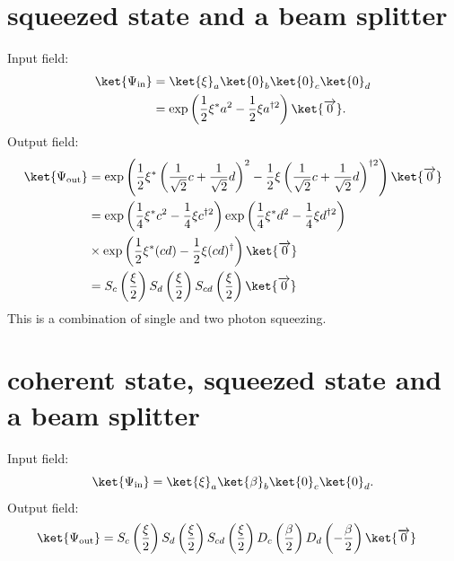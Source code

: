 \section{squeezed state and a beam splitter}
Input field:
\begin{align}
\ket{\Psi_{\rm{in}}} &= \ket{\xi}_a\ket{0}_b\ket{0}_c\ket{0}_d \\
&= \exp\left(\frac{1}{2}\xi^* a^2 - \frac{1}{2}\xi a^{\dagger 2} \right)\ket{\overrightarrow{0}}.
\end{align}
Output field:
\begin{align}
\ket{\Psi_{\rm{out}}} &= \exp\left(\frac{1}{2}\xi^* \left(\frac{1}{\sqrt{2}}c + \frac{1}{\sqrt{2}}d\right)^2 - \frac{1}{2}\xi \left(\frac{1}{\sqrt{2}}c + \frac{1}{\sqrt{2}}d\right)^{\dagger 2} \right)\ket{\overrightarrow{0}}\\
&= \exp\left(\frac{1}{4}\xi^* c^2 - \frac{1}{4}\xi c^{\dagger 2} \right)\exp\left(\frac{1}{4}\xi^* d^2 - \frac{1}{4}\xi d^{\dagger 2} \right)\\ &\times\exp\left(\frac{1}{2}\xi^* (cd) - \frac{1}{2}\xi (cd)^\dagger\right)\ket{\overrightarrow{0}}\\
&=S_c\left(\frac{\xi}{2}\right)S_d\left(\frac{\xi}{2}\right)S_{cd}\left(\frac{\xi}{2}\right)\ket{\overrightarrow{0}}
\end{align}
This is a combination of single and two photon squeezing.
\section{coherent state, squeezed state and a beam splitter}
Input field:
\begin{equation}
\ket{\Psi_{\rm{in}}} = \ket{\xi}_a\ket{\beta}_b\ket{0}_c\ket{0}_d.
\end{equation}
Output field:
\begin{align}
\ket{\Psi_{\rm{out}}} &= S_c\left(\frac{\xi}{2}\right)S_d\left(\frac{\xi}{2}\right)S_{cd}\left(\frac{\xi}{2}\right)D_c\left(\frac{\beta}{2}\right)D_d\left(-\frac{\beta}{2}\right)\ket{\overrightarrow{0}}
\end{align}